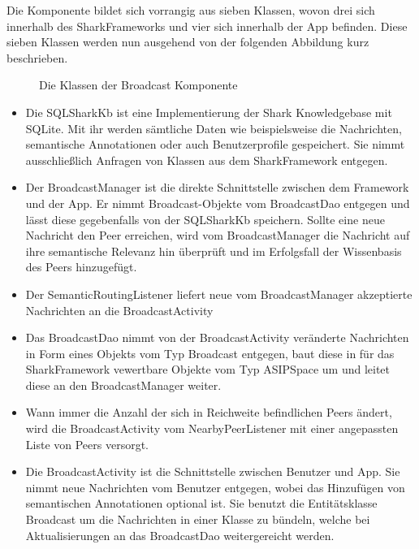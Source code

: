 Die Komponente bildet sich vorrangig aus sieben Klassen, wovon drei sich innerhalb des SharkFrameworks und vier sich innerhalb der App befinden. Diese sieben Klassen werden nun ausgehend von der folgenden Abbildung kurz beschrieben.
\begin{figure}[H]
	\centering
	\hspace*{1cm}
	\caption{Die Klassen der Broadcast Komponente}
	\label{fig:broadcastStructure}
\end{figure}
\begin{itemize}
	\item Die SQLSharkKb ist eine Implementierung der Shark Knowledgebase mit SQLite. Mit ihr werden sämtliche Daten wie beispielsweise die Nachrichten, semantische Annotationen oder auch Benutzerprofile gespeichert. Sie nimmt ausschließlich Anfragen von Klassen aus dem SharkFramework entgegen.
	\item Der BroadcastManager ist die direkte Schnittstelle zwischen dem Framework und der App. Er nimmt Broadcast-Objekte vom BroadcastDao entgegen und lässt diese gegebenfalls von der SQLSharkKb speichern. Sollte eine neue Nachricht den Peer erreichen, wird vom BroadcastManager die Nachricht auf ihre semantische Relevanz hin überprüft und im Erfolgsfall der Wissenbasis des Peers hinzugefügt.
	\item Der SemanticRoutingListener liefert neue vom BroadcastManager akzeptierte Nachrichten an die BroadcastActivity
	\item Das BroadcastDao nimmt von der BroadcastActivity veränderte Nachrichten in Form eines Objekts vom Typ Broadcast entgegen, baut diese in für das SharkFramework vewertbare Objekte vom Typ ASIPSpace um und leitet diese an den BroadcastManager weiter.
	\item Wann immer die Anzahl der sich in Reichweite befindlichen Peers ändert, wird die BroadcastActivity vom NearbyPeerListener mit einer angepassten Liste von Peers versorgt.
	\item Die BroadcastActivity ist die Schnittstelle zwischen Benutzer und App. Sie nimmt neue Nachrichten vom Benutzer entgegen, wobei das Hinzufügen von semantischen Annotationen optional ist. Sie benutzt die Entitätsklasse Broadcast um die Nachrichten in einer Klasse zu bündeln, welche bei Aktualisierungen an das BroadcastDao weitergereicht werden. 
\end{itemize}
